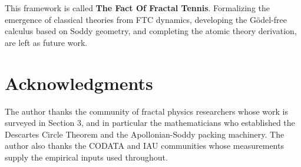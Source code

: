 \documentclass[11pt,a4paper]{article}
\begin{document}
This framework is called \textbf{The Fact Of Fractal Tennis}. Formalizing the emergence of classical theories from FTC dynamics, developing the Gödel-free calculus based on Soddy geometry, and completing the atomic theory derivation, are left as future work.

\section*{Acknowledgments}

The author thanks the community of fractal physics researchers whose work is surveyed in Section 3, and in particular the mathematicians who established the Descartes Circle Theorem and the Apollonian-Soddy packing machinery. The author also thanks the CODATA and IAU communities whose measurements supply the empirical inputs used throughout.
\end{document}
